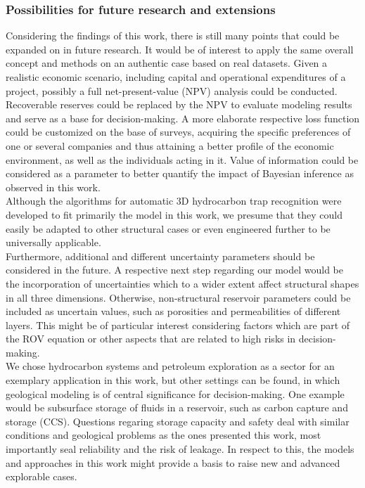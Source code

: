 	\subsubsection{Possibilities for future research and extensions}	
	Considering the findings of this work, there is still many points that could be expanded on in future research. It would be of interest to apply the same overall concept and methods on an authentic case based on real datasets. Given a realistic economic scenario, including capital and operational expenditures of a project, possibly a full net-present-value (NPV) analysis could be conducted. Recoverable reserves could be replaced by the NPV to evaluate modeling results and serve as a base for decision-making. A more elaborate respective loss function could be customized on the base of surveys, acquiring the specific preferences of one or several companies and thus attaining a better profile of the economic environment, as well as the individuals acting in it. Value of information could be considered as a parameter to better quantify the impact of Bayesian inference as observed in this work.\\
	Although the algorithms for automatic 3D hydrocarbon trap recognition were developed to fit primarily the model in this work, we presume that they could easily be adapted to other structural cases or even engineered further to be universally applicable.\\
	Furthermore, additional and different uncertainty parameters should be considered in the future. A respective next step regarding our model would be the incorporation of uncertainties which to a wider extent affect structural shapes in all three dimensions. Otherwise, non-structural reservoir parameters could be included as uncertain values, such as porosities and permeabilities of different layers. This might be of particular interest considering factors which are part of the ROV equation or other aspects that are related to high risks in decision-making.\\
	We chose hydrocarbon systems and petroleum exploration as a sector for an exemplary application in this work, but other settings can be found, in which geological modeling is of central significance for decision-making. One example would be subsurface storage of fluids in a reservoir, such as carbon capture and storage (CCS). Questions regaring storage capacity and safety deal with similar conditions and geological problems as the ones presented this work, most importantly seal reliability and the risk of leakage. In respect to this, the models and approaches in this work might provide a basis to raise new and advanced explorable cases.